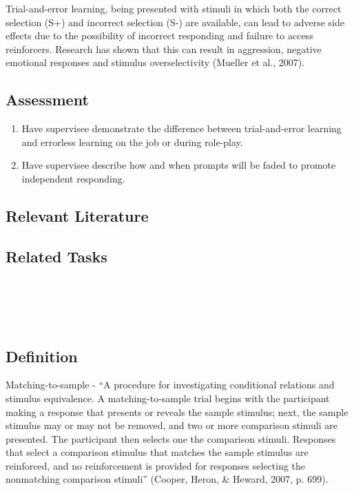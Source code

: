 Trial-and-error learning, being presented with stimuli in which both the correct selection (S+) and incorrect selection (S-) are available, can lead to adverse side effects due to the possibility of incorrect responding and failure to access reinforcers. Research has shown that this can result in aggression, negative emotional responses and stimulus overselectivity (Mueller et al., 2007).
%
\subsection{Assessment}
\begin{enumerate}
\item Have supervisee demonstrate the difference between trial-and-error learning and errorless learning on the job or during role-play.
\item Have supervisee describe how and when prompts will be faded to promote independent responding. 
%
\end{enumerate}
%
\subsection{Relevant Literature}
\begin{refsection}
\nocite{test,alang2017police,clayton2018black}
\printbibliography[heading=none]
\end{refsection}
%
\subsection{Related Tasks} 
\fourdThree{}\\
\fourdFour{}\\
\fourFKTwentyFour{}\\
%
%
%
%
%
%
%
%
\section{\foureThirteen{}}
\subsection{Definition} 
Matching-to-sample - ``A procedure for investigating conditional relations and stimulus equivalence. A matching-to-sample trial begins with the participant making a response that presents or reveals the sample stimulus; next, the sample stimulus may or may not be removed, and two or more comparison stimuli are presented. The participant then selects one the comparison stimuli. Responses that select a comparison stimulus that matches the sample stimulus are reinforced, and no reinforcement is provided for responses selecting the nonmatching comparison stimuli'' (Cooper, Heron, \& Heward, 2007, p. 699).

